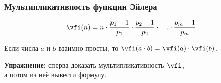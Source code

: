 \begin{frame} \frametitle{Мультипликативность функции Эйлера}
\[ \vfi(n) = n \cdot \frac{p_1 - 1}{p_1} \cdot \frac{p_2 - 1}{p_2} \cdot \ldots \cdot \frac{p_m - 1}{p_m} \] \vspace{5mm}

\begin{theorem} \vspace{2mm}
	Если числа $a$ и $b$ взаимно просты, то $\vfi(a \cdot b) = \vfi(a) \cdot \vfi(b)$.  \vspace{3mm}
\end{theorem} \vspace{5mm}

\textcolor{hard}{\bf Упражнение: } сперва доказать мультипликативность $\vfi$,\\ а потом из неё вывести формулу.
\end{frame}
